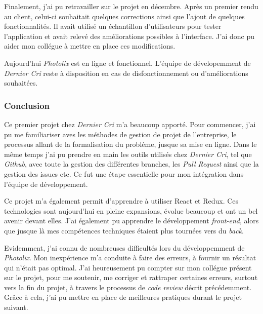 \documentclass[12pt,a4paper]{article}
\begin{document}
  \bigskip

  Finalement, j'ai pu retravailler sur le projet en décembre. Après un
  premier rendu au client, celui-ci souhaitait quelques corrections ainsi
  que l'ajout de quelques fonctionnalités. Il avait utilisé un échantillon
  d'utilisateurs pour tester l'application et avait relevé des
  améliorations possibles à l'interface. J'ai donc pu aider mon collégue à
  mettre en place ces modifications.

  \bigskip

  Aujourd'hui \emph{Photolix} est en ligne et fonctionnel. L'équipe de
  dévelopemment de \emph{Dernier Cri} reste à disposition en cas de
  disfonctionnement ou d'améliorations souhaitées.

  \subsubsection{Conclusion}\label{conclusion}

  \bigskip

  Ce premier projet chez \emph{Dernier Cri} m'a beaucoup apporté. Pour
  commencer, j'ai pu me familiariser aves les méthodes de gestion de
  projet de l'entreprise, le processus allant de la formalisation du
  probléme, jusque sa mise en ligne. Dans le même temps j'ai pu prendre en
  main les outils utilisés chez \emph{Dernier Cri}, tel que \emph{Github},
  avec toute la gestion des différentes branches, les \emph{Pull Request}
  ainsi que la gestion des issues etc. Ce fut une étape essentielle pour
  mon intégration dans l'équipe de développement.

  \bigskip

  Ce projet m'a également permit d'apprendre à utiliser React et Redux.
  Ces technologies sont aujourd'hui en pleine expansions, évolue beaucoup
  et ont un bel avenir devant elles. J'ai également pu apprendre le
  développement \emph{front-end}, alors que jusque là mes compétences
  techniques étaient plus tournées vers du \emph{back}.

  \bigskip

  Evidemment, j'ai connu de nombreuses difficultés lors du développemment
  de \emph{Photolix}. Mon inexpérience m'a conduite à faire des erreurs, à
  fournir un résultat qui n'était pas optimal. J'ai heureusement pu
  compter sur mon collégue présent sur le projet, pour me soutenir, me
  corriger et rattraper certaines erreurs, surtout vers la fin du projet,
  à travers le processus de \emph{code review} décrit précédemment. Grâce
  à cela, j'ai pu mettre en place de meilleures pratiques durant le projet
  suivant.
\end{document}
